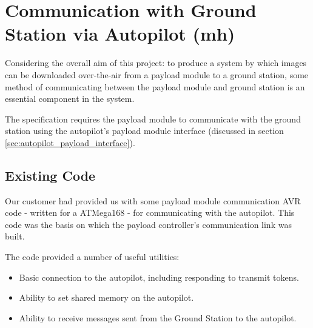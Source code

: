 
\section{Communication with Ground Station via Autopilot (mh)}
\label{sec:payload controller}
Considering the overall aim of this project: to produce a system by which 
images can be downloaded over-the-air from a payload module to a ground 
station, some method of communicating between the
payload module and ground station is an essential component in the system.

The specification requires the payload
module to communicate with the ground station using the autopilot's payload
module interface (discussed in section \ref{sec:autopilot_payload_interface}).


\subsection{Existing Code}
\label{sec:payload_existing_code}
Our customer had provided us with some payload module communication AVR code
- written for a ATMega168 - for communicating with the autopilot. This code
was the basis on which the payload controller's communication link was built.

The code provided a number of useful utilities:
\begin{itemize}
\item Basic connection to the autopilot, including responding to transmit tokens.

\item Ability to set shared memory on the autopilot.

\item Ability to receive messages sent from the Ground Station to the 
autopilot.
\end{itemize}

